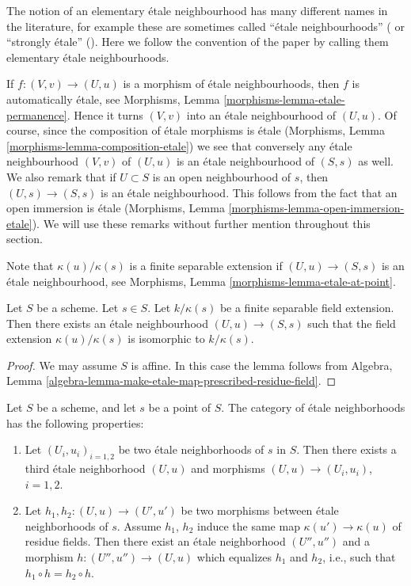 \noindent
The notion of an elementary \'etale neighbourhood has many different
names in the literature, for example these are sometimes called
``\'etale neighbourhoods'' (\cite[Page 36]{Milne} or
``strongly \'etale'' (\cite[Page 108]{KPR}).
Here we follow the convention of the paper
\cite{GruRay} by calling them elementary \'etale neighbourhoods.

\medskip\noindent
If $f : (V, v) \to (U, u)$ is a morphism of \'etale
neighbourhoods, then $f$ is automatically \'etale, see
Morphisms, Lemma \ref{morphisms-lemma-etale-permanence}.
Hence it turns $(V, v)$ into an \'etale neighbourhood of
$(U, u)$. Of course, since the composition of \'etale morphisms
is \'etale (Morphisms, Lemma \ref{morphisms-lemma-composition-etale})
we see that conversely any \'etale neighbourhood $(V, v)$ of
$(U, u)$ is an \'etale neighbourhood of $(S, s)$ as well.
We also remark that if $U \subset S$ is an open neighbourhood
of $s$, then $(U, s) \to (S, s)$ is an \'etale neighbourhood.
This follows from the fact that an open immersion is
\'etale (Morphisms, Lemma \ref{morphisms-lemma-open-immersion-etale}).
We will use these remarks without further mention throughout this
section.

\medskip\noindent
Note that $\kappa(u)/\kappa(s)$ is a finite separable extension
if $(U, u) \to (S, s)$ is an \'etale neighbourhood,
see Morphisms, Lemma \ref{morphisms-lemma-etale-at-point}.

\begin{lemma}
\label{lemma-realize-prescribed-residue-field-extension-etale}
Let $S$ be a scheme.
Let $s \in S$.
Let $k/\kappa(s)$ be a finite separable field extension.
Then there exists an \'etale neighbourhood $(U, u) \to (S, s)$
such that the field extension $\kappa(u)/\kappa(s)$ is
isomorphic to $k/\kappa(s)$.
\end{lemma}

\begin{proof}
We may assume $S$ is affine.
In this case the lemma follows from
Algebra, Lemma \ref{algebra-lemma-make-etale-map-prescribed-residue-field}.
\end{proof}

\begin{lemma}
\label{lemma-etale-neighbourhoods-not-quite-filtered}
Let $S$ be a scheme, and let $s$ be a point of $S$.
The category of \'etale neighborhoods has the following properties:
\begin{enumerate}
\item Let $(U_i, u_i)_{i=1, 2}$ be two \'etale neighborhoods of
$s$ in $S$. Then there exists a third \'etale neighborhood
$(U, u)$ and morphisms
$(U, u) \to (U_i, u_i)$, $i = 1, 2$.
\item Let $h_1, h_2: (U, u) \to (U', u')$ be two
morphisms between \'etale neighborhoods of $s$.
Assume $h_1$, $h_2$ induce the same map $\kappa(u') \to \kappa(u)$ of residue
fields. Then there exist an \'etale neighborhood $(U'', u'')$ and a morphism
$h : (U'', u'') \to (U, u)$
which equalizes $h_1$ and $h_2$, i.e., such that
$h_1 \circ h = h_2 \circ h$.
\end{enumerate}
\end{lemma}

